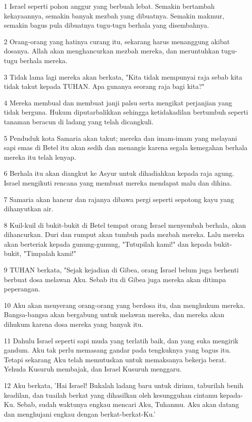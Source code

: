 \par 1 Israel seperti pohon anggur yang berbuah lebat. Semakin bertambah kekayaannya, semakin banyak mezbah yang dibuatnya. Semakin makmur, semakin bagus pula dibuatnya tugu-tugu berhala yang disembahnya.
\par 2 Orang-orang yang hatinya curang itu, sekarang harus menanggung akibat dosanya. Allah akan menghancurkan mezbah mereka, dan meruntuhkan tugu-tugu berhala mereka.
\par 3 Tidak lama lagi mereka akan berkata, "Kita tidak mempunyai raja sebab kita tidak takut kepada TUHAN. Apa gunanya seorang raja bagi kita?"
\par 4 Mereka membual dan membuat janji palsu serta mengikat perjanjian yang tidak berguna. Hukum diputarbalikkan sehingga ketidakadilan bertumbuh seperti tanaman beracun di ladang yang telah dicangkuli.
\par 5 Penduduk kota Samaria akan takut; mereka dan imam-imam yang melayani sapi emas di Betel itu akan sedih dan menangis karena segala kemegahan berhala mereka itu telah lenyap.
\par 6 Berhala itu akan diangkut ke Asyur untuk dihadiahkan kepada raja agung. Israel mengikuti rencana yang membuat mereka mendapat malu dan dihina.
\par 7 Samaria akan hancur dan rajanya dibawa pergi seperti sepotong kayu yang dihanyutkan air.
\par 8 Kuil-kuil di bukit-bukit di Betel tempat orang Israel menyembah berhala, akan dihancurkan. Duri dan rumput akan tumbuh pada mezbah mereka. Lalu mereka akan berteriak kepada gunung-gunung, "Tutupilah kami!" dan kepada bukit-bukit, "Timpalah kami!"
\par 9 TUHAN berkata, "Sejak kejadian di Gibea, orang Israel belum juga berhenti berbuat dosa melawan Aku. Sebab itu di Gibea juga mereka akan ditimpa peperangan.
\par 10 Aku akan menyerang orang-orang yang berdosa itu, dan menghukum mereka. Bangsa-bangsa akan bergabung untuk melawan mereka, dan mereka akan dihukum karena dosa mereka yang banyak itu.
\par 11 Dahulu Israel seperti sapi muda yang terlatih baik, dan yang suka mengirik gandum. Aku tak perlu memasang gandar pada tengkuknya yang bagus itu. Tetapi sekarang Aku telah memutuskan untuk memaksanya bekerja berat. Yehuda Kusuruh membajak, dan Israel Kusuruh menggaru.
\par 12 Aku berkata, 'Hai Israel! Bukalah ladang baru untuk dirimu, taburilah benih keadilan, dan tuailah berkat yang dihasilkan oleh kesungguhan cintamu kepada-Ku. Sebab, sudah waktunya engkau mencari Aku, Tuhanmu. Aku akan datang dan menghujani engkau dengan berkat-berkat-Ku.'
